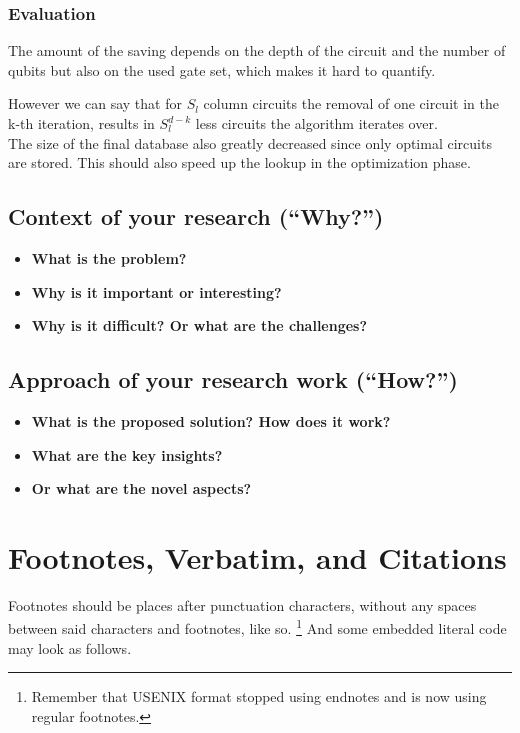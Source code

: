\subsubsection{Evaluation}
The amount of the saving depends on the depth of the circuit and the number of qubits but also on the used gate set, which makes it hard to quantify. 

However we can say that for $S_l$ column circuits the removal of one circuit in the k-th iteration, results in $S_l^{d-k}$ less circuits the algorithm iterates over.\\

The size of the final database also greatly decreased since only optimal circuits are stored. This should also speed up the lookup in the optimization phase.
\subsection{Context of your research (``Why?'')}
\begin{itemize}
  \item \textbf{What is the problem?}
  \item \textbf{Why is it important or interesting?}
  \item \textbf{Why is it difficult? Or what are the challenges?}
\end{itemize}

\subsection{Approach of your research work (``How?'')}
\begin{itemize}
  \item \textbf{What is the proposed solution? How does it work?}
  \item \textbf{What are the key insights?}
  \item \textbf{Or what are the novel aspects?}
\end{itemize}

\section{Footnotes, Verbatim, and Citations}

Footnotes should be places after punctuation characters, without any
spaces between said characters and footnotes, like so.%
\footnote{Remember that USENIX format stopped using endnotes and is
  now using regular footnotes.} And some embedded literal code may
look as follows.

